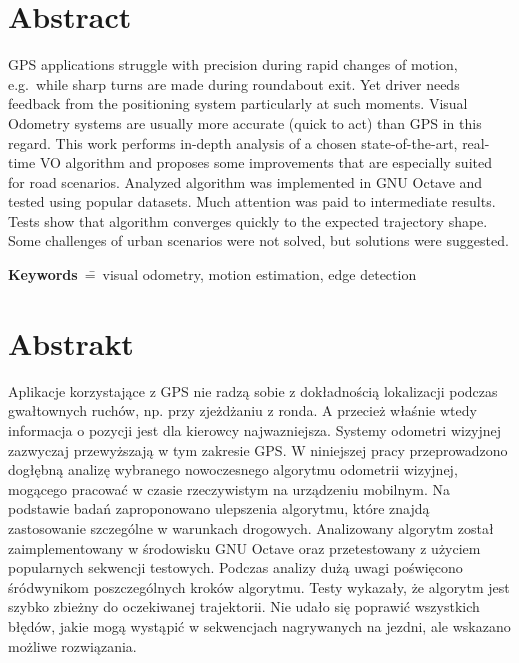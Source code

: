 
\section*{Abstract}


GPS applications struggle with precision during rapid changes of motion, e.g.~while sharp turns are made during roundabout exit. Yet driver needs feedback from the positioning system particularly at such moments.
Visual Odometry systems are usually more accurate (quick to act) than GPS in this regard.
This work performs in-depth analysis of a chosen state-of-the-art, real-time VO algorithm and proposes some improvements that are especially suited for road scenarios.
Analyzed algorithm was implemented in GNU Octave and tested using popular datasets. Much attention was paid to intermediate results.
Tests show that algorithm converges quickly to the expected trajectory shape. Some challenges of urban scenarios were not solved, but solutions were suggested.

\textbf{Keywords}~\==~visual odometry, motion estimation, edge detection

\section*{Abstrakt}

Aplikacje korzystające z GPS nie radzą sobie z dokładnością lokalizacji podczas gwałtownych ruchów, np. przy zjeżdżaniu z ronda. A przecież właśnie wtedy informacja o pozycji jest dla kierowcy najwazniejsza.
Systemy odometri wizyjnej zazwyczaj przewyższają w tym zakresie GPS.
W niniejszej pracy przeprowadzono dogłębną analizę wybranego nowoczesnego algorytmu odometrii wizyjnej, mogącego pracować w czasie rzeczywistym na urządzeniu mobilnym. Na podstawie badań zaproponowano ulepszenia algorytmu, które znajdą zastosowanie szczególne w warunkach drogowych.
Analizowany algorytm został zaimplementowany w środowisku GNU Octave oraz przetestowany z użyciem popularnych sekwencji testowych. Podczas analizy dużą uwagi poświęcono śródwynikom poszczególnych kroków algorytmu.
Testy wykazały, że algorytm jest szybko zbieżny do oczekiwanej trajektorii. Nie udało się poprawić wszystkich błędów, jakie mogą wystąpić w sekwencjach nagrywanych na jezdni, ale wskazano możliwe rozwiązania.

